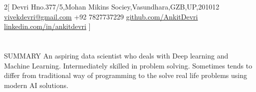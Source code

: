 \documentclass{my_cv}
\begin{document}
\begin{multicols}{2}[
        {Devri}%
        {Hno.377/5,Mohan Mikins Sociey,Vasundhara,GZB,UP,201012}%
        {\href{mailto:first.last@mail.com}{vivekdevri@gmail.com}}%
        {+92 7827737229}%
        {\href{https://github.com/AnkitDevri/}{github.com/AnkitDevri}}%
        {\href{https://www.linkedin.com/in/ankitdevri/}{linkedin.com/in/ankitdevri}}%
        {}
]
\end{multicols}

\section{\faFileText}{SUMMARY}
An aspiring data scientist who deals with Deep learning and Machine Learning.
Intermediately skilled in problem solving. Sometimes tends to differ from traditional way of programming to the solve real life problems using modern AI solutions.
\end{document}
